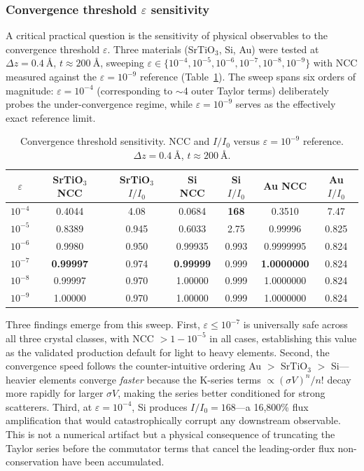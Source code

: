 \documentclass[twoside,11pt]{article}
\begin{document}
\subsubsection{Convergence threshold $\varepsilon$ sensitivity}\label{sec:epsilon}

A critical practical question is the sensitivity of physical observables to the convergence threshold $\varepsilon$. Three materials (SrTiO$_3$, Si, Au) were tested at $\Delta z=\SI{0.4}{\angstrom}$, $t\approx\SI{200}{\angstrom}$, sweeping $\varepsilon\in\{10^{-4},10^{-5},10^{-6},10^{-7},10^{-8},10^{-9}\}$ with NCC measured against the $\varepsilon=10^{-9}$ reference (Table~\ref{tab:epsilon}). The sweep spans six orders of magnitude: $\varepsilon=10^{-4}$ (corresponding to $\sim$4 outer Taylor terms) deliberately probes the under-convergence regime, while $\varepsilon=10^{-9}$ serves as the effectively exact reference limit.

\begin{table}[H]
\centering
\caption{Convergence threshold sensitivity. NCC and $I/I_0$ versus $\varepsilon=10^{-9}$ reference. $\Delta z=\SI{0.4}{\angstrom}$, $t\approx\SI{200}{\angstrom}$.}\label{tab:epsilon}
\small
\begin{tabular}{ccccccc}
\toprule
$\varepsilon$ & SrTiO$_3$ NCC & SrTiO$_3$ $I/I_0$ & Si NCC & Si $I/I_0$ & Au NCC & Au $I/I_0$ \\
\midrule
$10^{-4}$ & 0.4044 & 4.08 & 0.0684 & \textbf{168} & 0.3510 & 7.47 \\
$10^{-5}$ & 0.8389 & 0.945 & 0.6033 & 2.75 & 0.99996 & 0.825 \\
$10^{-6}$ & 0.9980 & 0.950 & 0.99935 & 0.993 & 0.9999995 & 0.824 \\
$10^{-7}$ & \textbf{0.99997} & 0.974 & \textbf{0.99999} & 0.999 & \textbf{1.0000000} & 0.824 \\
$10^{-8}$ & 0.99997 & 0.970 & 1.00000 & 0.999 & 1.0000000 & 0.824 \\
$10^{-9}$ & 1.00000 & 0.970 & 1.00000 & 0.999 & 1.0000000 & 0.824 \\
\bottomrule
\end{tabular}
\end{table}

Three findings emerge from this sweep. First, $\varepsilon\le10^{-7}$ is universally safe across all three crystal classes, with NCC $>1-10^{-5}$ in all cases, establishing this value as the validated production default for light to heavy elements. Second, the convergence speed follows the counter-intuitive ordering Au $>$ SrTiO$_3$ $>$ Si---heavier elements converge \textit{faster} because the K-series terms $\propto(\sigma V)^n/n!$ decay more rapidly for larger $\sigma V$, making the series better conditioned for strong scatterers. Third, at $\varepsilon=10^{-4}$, Si produces $I/I_0=168$---a 16,800\% flux amplification that would catastrophically corrupt any downstream observable. This is not a numerical artifact but a physical consequence of truncating the Taylor series before the commutator terms that cancel the leading-order flux non-conservation have been accumulated.
\end{document}
